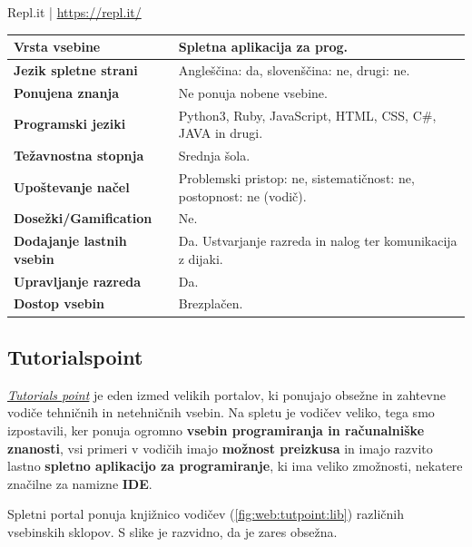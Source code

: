 \begin{osebnabox}[label={osebna:replIT}]{Repl.it | \url{https://repl.it/}}
    \begin{tabular}{
  p{} |
  p{}  }
  \textbf{Vrsta vsebine} & Spletna aplikacija za prog. \\
      \hline
  \textbf{Jezik spletne strani} & Angleščina: da, slovenščina: ne,
                                  drugi: ne. \\
      \hline
  \textbf{Ponujena znanja} & Ne ponuja nobene vsebine.\\
      \hline
 \textbf{Programski jeziki} & Python3,
  Ruby, JavaScript, HTML, CSS, C\#, JAVA in drugi.\\
      \hline
  \textbf{Težavnostna stopnja} & Srednja šola.\\
      \hline
   \textbf{Upoštevanje načel} & Problemski pristop: ne,
                                sistematičnost: ne, postopnost: ne (vodič). \\
      \hline
  \textbf{Dosežki/Gamification} & Ne. \\
      \hline
  \textbf{Dodajanje lastnih vsebin} & Da. Ustvarjanje razreda in nalog
                                      ter komunikacija z dijaki. \\
      \hline
  \textbf{Upravljanje razreda} & Da. \\
      \hline
  \textbf{Dostop vsebin} & Brezplačen. \\

\end{tabular}
\end{osebnabox}

\subsection{Tutorialspoint}
\label{sec:tutorials_point}

\emph{\href{http://www.tutorialspoint.com/}{Tutorials point}}
\cite{web:tutorialspoint} je eden izmed velikih portalov, ki ponujajo
obsežne in zahtevne vodiče tehničnih in netehničnih vsebin. Na
spletu je vodičev veliko, tega smo izpostavili, ker ponuja
ogromno \textbf{vsebin programiranja in računalniške znanosti}, vsi
primeri v vodičih imajo \textbf{možnost preizkusa} in imajo razvito 
lastno \textbf{spletno aplikacijo za programiranje}, ki ima veliko
zmožnosti, nekatere značilne za namizne \textbf{IDE}.

Spletni portal ponuja knjižnico vodičev (\ref{fig:web:tutpoint:lib})
različnih vsebinskih sklopov. S slike je razvidno, da je zares
obsežna.

